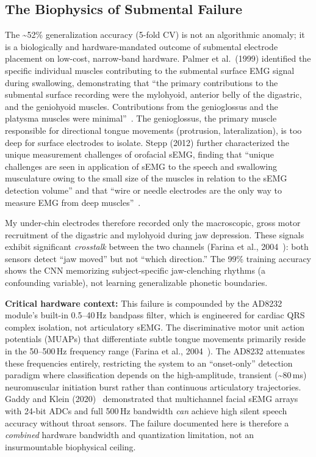 \documentclass[11pt, a4paper]{article}
\begin{document}
\subsection{The Biophysics of Submental Failure}

The \textasciitilde52\% generalization accuracy (5-fold CV) is not an algorithmic anomaly; it is a biologically and hardware-mandated outcome of submental electrode placement on low-cost, narrow-band hardware. Palmer et al.\ (1999) identified the specific individual muscles contributing to the submental surface EMG signal during swallowing, demonstrating that ``the primary contributions to the submental surface recording were the mylohyoid, anterior belly of the digastric, and the geniohyoid muscles. Contributions from the genioglossus and the platysma muscles were minimal''~\cite{palmer1999}. The genioglossus, the primary muscle responsible for directional tongue movements (protrusion, lateralization), is too deep for surface electrodes to isolate. Stepp (2012) further characterized the unique measurement challenges of orofacial sEMG, finding that ``unique challenges are seen in application of sEMG to the speech and swallowing musculature owing to the small size of the muscles in relation to the sEMG detection volume'' and that ``wire or needle electrodes are the only way to measure EMG from deep muscles''~\cite{stepp2012}.

My under-chin electrodes therefore recorded only the macroscopic, gross motor recruitment of the digastric and mylohyoid during jaw depression. These signals exhibit significant \emph{crosstalk} between the two channels (Farina et al., 2004~\cite{farina2014}): both sensors detect ``jaw moved'' but not ``which direction.'' The 99\% training accuracy shows the CNN memorizing subject-specific jaw-clenching rhythms (a confounding variable), not learning generalizable phonetic boundaries.

\textbf{Critical hardware context:} This failure is compounded by the AD8232 module's built-in 0.5--40\,Hz bandpass filter, which is engineered for cardiac QRS complex isolation, not articulatory sEMG. The discriminative motor unit action potentials (MUAPs) that differentiate subtle tongue movements primarily reside in the 50--500\,Hz frequency range (Farina et al., 2004~\cite{farina2014}). The AD8232 attenuates these frequencies entirely, restricting the system to an ``onset-only'' detection paradigm where classification depends on the high-amplitude, transient (\textasciitilde80\,ms) neuromuscular initiation burst rather than continuous articulatory trajectories. Gaddy and Klein (2020)~\cite{gaddy2020} demonstrated that multichannel facial sEMG arrays with 24-bit ADCs and full 500\,Hz bandwidth \emph{can} achieve high silent speech accuracy without throat sensors. The failure documented here is therefore a \emph{combined} hardware bandwidth and quantization limitation, not an insurmountable biophysical ceiling.
\end{document}
